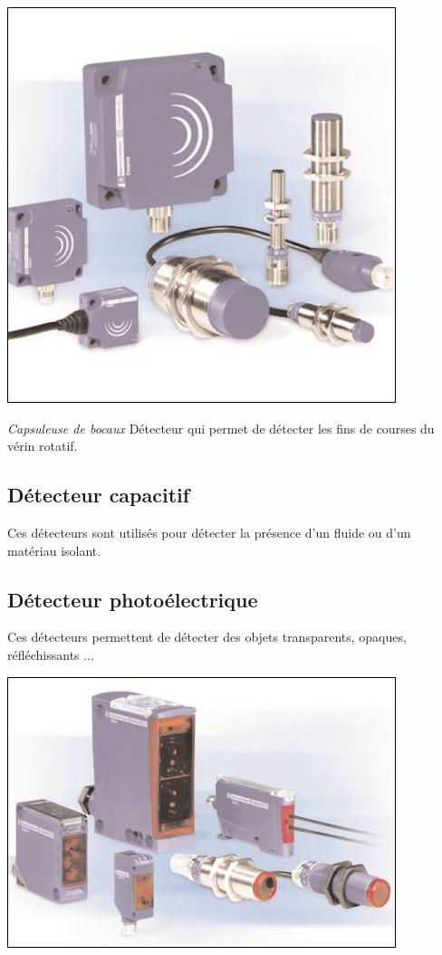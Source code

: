 \documentclass[10pt]{article}
\begin{document}
\begin{center}
 \includegraphics[width=.4\textwidth]{images/deductif_3}
\end{center}
\begin{exemple}
\textit{Capsuleuse de bocaux}
Détecteur qui permet de détecter les fins de courses du vérin rotatif.
\end{exemple}


\subsection{Détecteur capacitif}
Ces détecteurs sont utilisés pour détecter la présence d'un fluide ou d'un matériau isolant.


\subsection{Détecteur photoélectrique}
Ces détecteurs permettent de détecter des objets transparents, opaques, réfléchissants ...

\begin{center}
\includegraphics[width=.4\textwidth]{images/photo_1}
\end{center}
\end{document}
